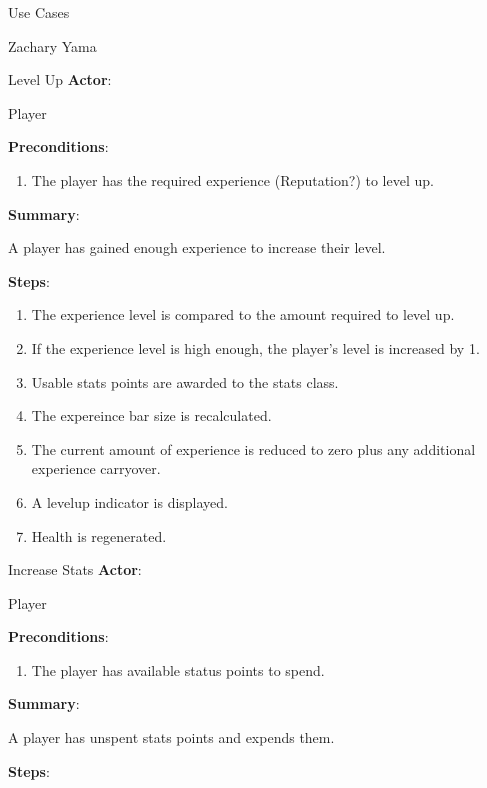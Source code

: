 \documentclass[12pt]{report}
\begin{document}
\begin{section}{Use Cases}
\begin{subsection}{Zachary Yama}
\begin{subsubsection}{Level Up}
\textbf{Actor}:

Player

\textbf{Preconditions}:

\begin{enumerate}
\item The player has the required experience (Reputation?) to level up.
\end{enumerate}

\textbf{Summary}:

A player has gained enough experience to increase their level. 

\textbf{Steps}:

\begin{enumerate}
\item The experience level is compared to the amount required to level up. 
\item If the experience level is high enough, the player's level is
increased by 1.
\item Usable stats points are awarded to the stats class. 
\item The expereince bar size is recalculated.
\item The current amount of experience is reduced to zero plus any
additional experience carryover.
\item A levelup indicator is displayed.
\item Health is regenerated.
\end{enumerate}
\end{subsubsection}

\begin{subsubsection}{Increase Stats}
\textbf{Actor}:

Player

\textbf{Preconditions}:

\begin{enumerate}
\item The player has available status points to spend.
\end{enumerate}

\textbf{Summary}:

A player has unspent stats points and expends them. 

\textbf{Steps}:


\end{subsubsection}
\end{subsection}
\end{section}
\end{document}
